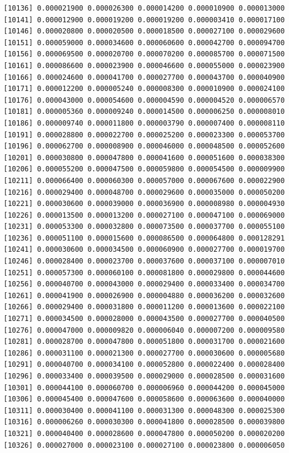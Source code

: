 \documentclass[]{article}
\begin{document}
\begin{verbatim}
[10136] 0.000021900 0.000026300 0.000014200 0.000010900 0.000013000
[10141] 0.000012900 0.000019200 0.000019200 0.000003410 0.000017100
[10146] 0.000020800 0.000020500 0.000018500 0.000027100 0.000029600
[10151] 0.000059000 0.000034600 0.000060600 0.000042700 0.000094700
[10156] 0.000069500 0.000020700 0.000070200 0.000085700 0.000071500
[10161] 0.000086600 0.000023900 0.000046600 0.000055000 0.000023900
[10166] 0.000024600 0.000041700 0.000027700 0.000043700 0.000040900
[10171] 0.000012200 0.000005240 0.000008300 0.000010900 0.000024100
[10176] 0.000043000 0.000054600 0.000004590 0.000004520 0.000006570
[10181] 0.000005360 0.000009240 0.000014500 0.000006250 0.000008010
[10186] 0.000009740 0.000011800 0.000003790 0.000007400 0.000008110
[10191] 0.000028800 0.000022700 0.000025200 0.000023300 0.000053700
[10196] 0.000062700 0.000008900 0.000046000 0.000048500 0.000052600
[10201] 0.000030800 0.000047800 0.000041600 0.000051600 0.000038300
[10206] 0.000055200 0.000047500 0.000059800 0.000054500 0.000009900
[10211] 0.000066400 0.000060300 0.000057000 0.000067600 0.000022900
[10216] 0.000029400 0.000048700 0.000029600 0.000035000 0.000050200
[10221] 0.000030600 0.000039000 0.000036900 0.000008980 0.000004930
[10226] 0.000013500 0.000013200 0.000027100 0.000047100 0.000069000
[10231] 0.000053300 0.000032800 0.000073500 0.000037700 0.000055100
[10236] 0.000051100 0.000015600 0.000086500 0.000064800 0.000128291
[10241] 0.000030600 0.000034500 0.000060900 0.000027700 0.000019700
[10246] 0.000028400 0.000023700 0.000037600 0.000037100 0.000007010
[10251] 0.000057300 0.000060100 0.000081800 0.000029800 0.000044600
[10256] 0.000040700 0.000043000 0.000029400 0.000033400 0.000034700
[10261] 0.000041900 0.000026900 0.000004880 0.000036200 0.000032600
[10266] 0.000029400 0.000031800 0.000011200 0.000013600 0.000022100
[10271] 0.000034500 0.000028000 0.000043500 0.000027700 0.000040500
[10276] 0.000047000 0.000009820 0.000006040 0.000007200 0.000009580
[10281] 0.000028700 0.000047800 0.000051800 0.000031700 0.000021600
[10286] 0.000031100 0.000021300 0.000027700 0.000030600 0.000005680
[10291] 0.000040700 0.000034100 0.000052800 0.000022400 0.000028400
[10296] 0.000033400 0.000039500 0.000029000 0.000028500 0.000031600
[10301] 0.000044100 0.000060700 0.000006960 0.000044200 0.000045000
[10306] 0.000045400 0.000047600 0.000058600 0.000063600 0.000040000
[10311] 0.000030400 0.000041100 0.000031300 0.000048300 0.000025300
[10316] 0.000006260 0.000030300 0.000041800 0.000028500 0.000039800
[10321] 0.000040400 0.000028600 0.000047800 0.000050200 0.000020200
[10326] 0.000027000 0.000023100 0.000027100 0.000023800 0.000006050

\end{verbatim}
\end{document}
